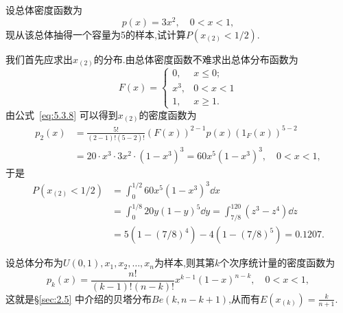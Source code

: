 \begin{example}\label{exam:5.3.7}
设总体密度函数为
\[p(x)=3x^2,\quad0<x<1,\]
现从该总体抽得一个容量为5的样本,试计算$P(x_{(2)}<1/2)$.
\end{example}
\begin{solution}
我们首先应求出$x_{(2)}$的分布.由总体密度函数不难求出总体分布函数为
\[F(x)=\begin{cases}
0,&x\leq0;\\
x^3,&0<x<1\\
1,&x\geq1.
\end{cases}\]
由公式~\eqref{eq:5.3.8} 可以得到$x_{(2)}$的密度函数为
\begin{align*}
p_2(x)&=\frac{5!}{(2-1)!(5-2)!}(F(x))^{2-1}p(x)(1_F(x))^{5-2}\\
&=20\cdot x^3\cdot3x^2\cdot(1-x^3)^3=60x^5(1-x^3)^3,\quad 0<x<1,
\end{align*}
于是
\begin{align*}
P(x_{(2)}<1/2)&=\int_0^{1/2}60x^5(1-x^3)^3\dd x\\
&=\int_0^{1/8}20y(1-y)^5\dd y=\int_{7/8}^120(z^3-z^4)\dd z\\
&=5(1-(7/8)^4)-4(1-(7/8)^5)=0.1207.
\end{align*}
\end{solution}
\begin{example}\label{exam:5.3.8}
设总体分布为$U(0,1),x_1,x_2,\dotsc,x_n$为样本,则其第$k$个次序统计量的密度函数为
\[p_k(x)=\frac{n!}{(k-1)!(n-k)!}x^{k-1}(1-x)^{n-k},\quad0<x<1,\]
这就是\S\ref{sec:2.5} 中介绍的贝塔分布$Be(k,n-k+1)$,从而有$E(x_{(k)})=\frac k{n+1}$.
\end{example}

